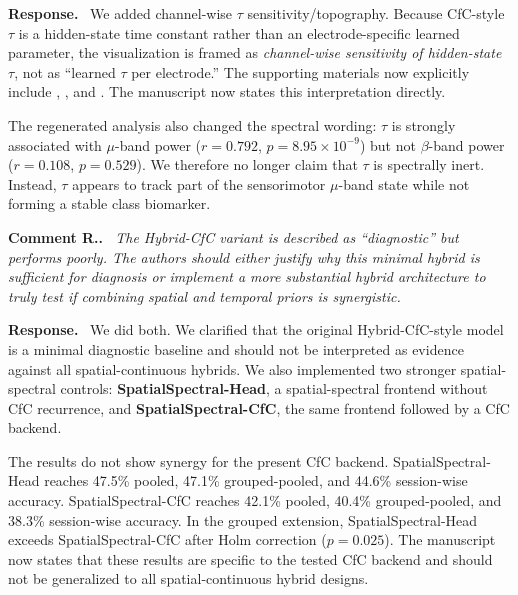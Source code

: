 \documentclass[11pt]{article}
\newcounter{reviewer}
\newcounter{point}[reviewer]
\renewcommand{\thepoint}{\thereviewer.\arabic{point}}
\newenvironment{reviewercomment}
  {\refstepcounter{point}\medskip\noindent\textbf{Comment R\thepoint.}\itshape\ }
  {\par}
\newenvironment{response}
  {\medskip\noindent\textbf{Response.}\ }
  {\par\medskip}
\begin{document}
\begin{response}
We added channel-wise $\tau$ sensitivity/topography. Because CfC-style $\tau$ is a hidden-state time constant rather than an electrode-specific learned parameter, the visualization is framed as \emph{channel-wise sensitivity of hidden-state $\tau$}, not as ``learned $\tau$ per electrode.'' The supporting materials now explicitly include , , and . The manuscript now states this interpretation directly.

The regenerated analysis also changed the spectral wording: $\tau$ is strongly associated with $\mu$-band power ($r=0.792$, $p=8.95\times10^{-9}$) but not $\beta$-band power ($r=0.108$, $p=0.529$). We therefore no longer claim that $\tau$ is spectrally inert. Instead, $\tau$ appears to track part of the sensorimotor $\mu$-band state while not forming a stable class biomarker.
\end{response}

\begin{reviewercomment}
The Hybrid-CfC variant is described as ``diagnostic'' but performs poorly. The authors should either justify why this minimal hybrid is sufficient for diagnosis or implement a more substantial hybrid architecture to truly test if combining spatial and temporal priors is synergistic.
\end{reviewercomment}

\begin{response}
We did both. We clarified that the original Hybrid-CfC-style model is a minimal diagnostic baseline and should not be interpreted as evidence against all spatial-continuous hybrids. We also implemented two stronger spatial-spectral controls: \textbf{SpatialSpectral-Head}, a spatial-spectral frontend without CfC recurrence, and \textbf{SpatialSpectral-CfC}, the same frontend followed by a CfC backend.

The results do not show synergy for the present CfC backend. SpatialSpectral-Head reaches 47.5\% pooled, 47.1\% grouped-pooled, and 44.6\% session-wise accuracy. SpatialSpectral-CfC reaches 42.1\% pooled, 40.4\% grouped-pooled, and 38.3\% session-wise accuracy. In the grouped extension, SpatialSpectral-Head exceeds SpatialSpectral-CfC after Holm correction ($p=0.025$). The manuscript now states that these results are specific to the tested CfC backend and should not be generalized to all spatial-continuous hybrid designs.
\end{response}
\end{document}
